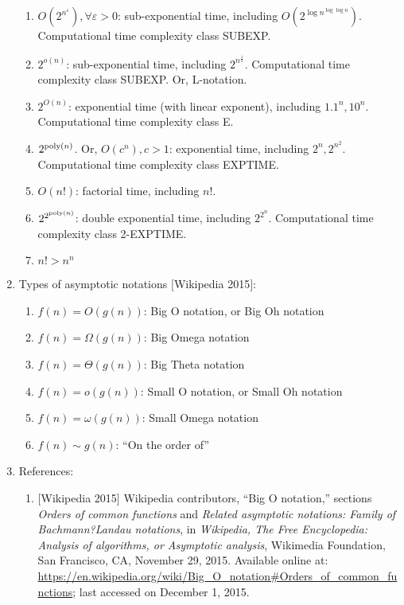 \begin{enumerate}
\begin{enumerate}
	\item $O(2^{n^{\varepsilon}}), \forall \varepsilon > 0$: sub-exponential time, including $O(2^{\log n^{\log \log n}})$. Computational time complexity class SUBEXP.
	\item $2^{o(n)}$: sub-exponential time, including $2^{n^{\frac{1}{3}}}$. Computational time complexity class SUBEXP. Or, L-notation.
	\item $2^{O(n)}$: exponential time (with linear exponent), including $1.1^{n}, 10^{n}$. Computational time complexity class E.
	\item $2^{{\rm poly}(n)}$. Or, $O(c^{n}), c > 1$: exponential time, including $2^{n}, 2^{n^{2}}$. Computational time complexity class EXPTIME.
	\item $O(n!)$: factorial time, including $n!$.
	\item $2^{2^{{\rm poly}(n)}}$: double exponential time, including $2^{2^{n}}$. Computational time complexity class 2-EXPTIME.
	\item $n! > n^{n}$
	\end{enumerate}
\item Types of asymptotic notations $[$Wikipedia 2015$]$: \vspace{-0.3cm}
	\begin{enumerate} \itemsep -2pt
	\item $f(n) = O(g(n))$: Big O notation, or Big Oh notation
	\item $f(n) = \Omega(g(n))$: Big Omega notation
	\item $f(n) = \Theta(g(n))$: Big Theta notation
	\item $f(n) = o(g(n))$: Small O notation, or Small Oh notation
	\item $f(n) = \omega(g(n))$: Small Omega notation
	\item $f(n) \sim g(n)$: ``On the order of''
	\end{enumerate}
\item References: \vspace{-0.3cm}
	\begin{enumerate} \itemsep -2pt
	\item $[$Wikipedia 2015$]$ Wikipedia contributors, ``Big O notation,'' sections {\it Orders of common functions} and {\it Related asymptotic notations: Family of Bachmann?Landau notations}, in {\it Wikipedia, The Free Encyclopedia: Analysis of algorithms, or Asymptotic analysis}, Wikimedia Foundation, San Francisco, CA, November 29, 2015. Available online at: \url{https://en.wikipedia.org/wiki/Big_O_notation#Orders_of_common_functions}; last accessed on December 1, 2015.

\end{enumerate}
\end{enumerate}
